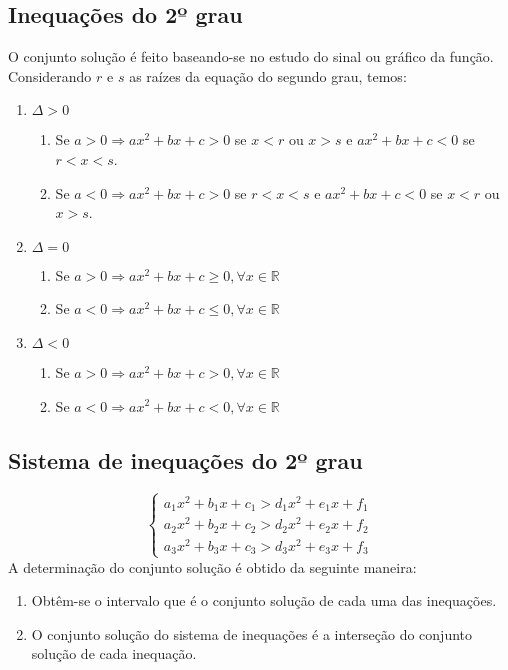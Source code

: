 \documentclass{article}
\begin{document}
\subsection{Inequações do 2º grau}
O conjunto solução é feito baseando-se no estudo do sinal ou gráfico da função. Considerando $r$ e $s$ as raízes da equação do segundo grau, temos:
\begin{enumerate}
    \item $\Delta>0$
        \begin{enumerate}[\quad 1)]
            \item Se $a>0\Rightarrow ax^2+bx+c>0$ se $x<r$ ou $x>s$ e $ax^2+bx+c<0$ se $r<x<s$.
            \item Se $a<0\Rightarrow ax^2+bx+c>0$ se $r<x<s$ e $ax^2+bx+c<0$ se $x<r$ ou $x>s$.
        \end{enumerate}
    \item $\Delta=0$
        \begin{enumerate}[\quad 1)]
            \item Se $a>0\Rightarrow ax^2+bx+c \geq 0, \forall x \in \mathbb{R}$
            \item Se $a<0\Rightarrow ax^2+bx+c \leq 0, \forall x \in \mathbb{R}$
        \end{enumerate}
    \item $\Delta<0$
        \begin{enumerate}[\quad 1)]
            \item Se $a>0\Rightarrow ax^2+bx+c > 0, \forall x \in \mathbb{R}$
            \item Se $a<0\Rightarrow ax^2+bx+c < 0, \forall x \in \mathbb{R}$
        \end{enumerate}
\end{enumerate}

\subsection{Sistema de inequações do 2º grau}
\begin{equation*}
    \left\{\begin{aligned}
        a_1x^2+b_1x+c_1>d_1x^2+e_1x+f_1\\
        a_2x^2+b_2x+c_2>d_2x^2+e_2x+f_2\\
        a_3x^2+b_3x+c_3>d_3x^2+e_3x+f_3
    \end{aligned}\right.
\end{equation*}
\indent A determinação do conjunto solução é obtido da seguinte maneira:
\begin{enumerate}
    \item Obtêm-se o intervalo que é o conjunto solução de cada uma das inequações.
    \item O conjunto solução do sistema de inequações é a interseção do conjunto solução de cada inequação.
\end{enumerate}
\end{document}
